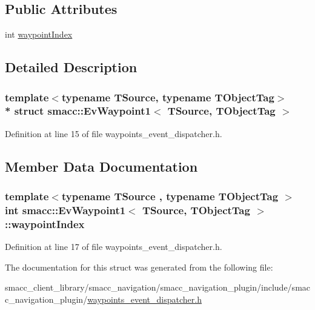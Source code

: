 \subsection*{Public Attributes}
\begin{DoxyCompactItemize}
\item 
int \hyperlink{structsmacc_1_1EvWaypoint1_a2ba7d933c774b4815f8e7303ccdfc039}{waypoint\+Index}
\end{DoxyCompactItemize}


\subsection{Detailed Description}
\subsubsection*{template$<$typename T\+Source, typename T\+Object\+Tag$>$\\*
struct smacc\+::\+Ev\+Waypoint1$<$ T\+Source, T\+Object\+Tag $>$}



Definition at line 15 of file waypoints\+\_\+event\+\_\+dispatcher.\+h.



\subsection{Member Data Documentation}
\subsubsection[{\texorpdfstring{waypoint\+Index}{waypointIndex}}]{\setlength{\rightskip}{0pt plus 5cm}template$<$typename T\+Source , typename T\+Object\+Tag $>$ int {\bf smacc\+::\+Ev\+Waypoint1}$<$ T\+Source, T\+Object\+Tag $>$\+::waypoint\+Index}\hypertarget{structsmacc_1_1EvWaypoint1_a2ba7d933c774b4815f8e7303ccdfc039}{}\label{structsmacc_1_1EvWaypoint1_a2ba7d933c774b4815f8e7303ccdfc039}


Definition at line 17 of file waypoints\+\_\+event\+\_\+dispatcher.\+h.



The documentation for this struct was generated from the following file\+:\begin{DoxyCompactItemize}
\item 
smacc\+\_\+client\+\_\+library/smacc\+\_\+navigation/smacc\+\_\+navigation\+\_\+plugin/include/smacc\+\_\+navigation\+\_\+plugin/\hyperlink{waypoints__event__dispatcher_8h}{waypoints\+\_\+event\+\_\+dispatcher.\+h}\end{DoxyCompactItemize}
